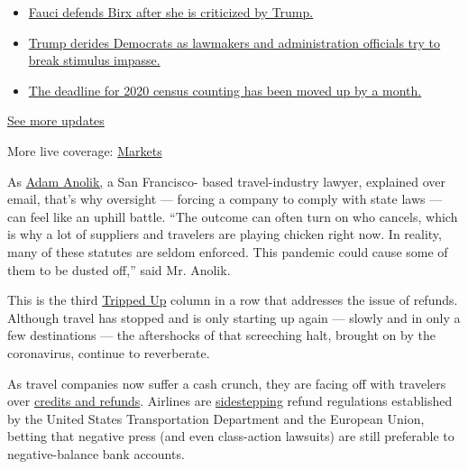 \begin{itemize}
\tightlist
\item
  \href{https://www.nytimes.com/2020/08/03/world/coronavirus-covid-19.html?action=click\&pgtype=Article\&state=default\&region=MAIN_CONTENT_1\&context=storylines_live_updates\#link-4547638f}{Fauci
  defends Birx after she is criticized by Trump.}
\item
  \href{https://www.nytimes.com/2020/08/03/world/coronavirus-covid-19.html?action=click\&pgtype=Article\&state=default\&region=MAIN_CONTENT_1\&context=storylines_live_updates\#link-15e7f995}{Trump
  derides Democrats as lawmakers and administration officials try to
  break stimulus impasse.}
\item
  \href{https://www.nytimes.com/2020/08/03/world/coronavirus-covid-19.html?action=click\&pgtype=Article\&state=default\&region=MAIN_CONTENT_1\&context=storylines_live_updates\#link-e5a2cda}{The
  deadline for 2020 census counting has been moved up by a month.}
\end{itemize}

\href{https://www.nytimes.com/2020/08/03/world/coronavirus-covid-19.html?action=click\&pgtype=Article\&state=default\&region=MAIN_CONTENT_1\&context=storylines_live_updates}{See
more updates}

More live coverage:
\href{https://www.nytimes.com/live/2020/08/03/business/stock-market-today-coronavirus?action=click\&pgtype=Article\&state=default\&region=MAIN_CONTENT_1\&context=storylines_live_updates}{Markets}

As \href{https://travellaw.com/}{Adam Anolik,} a San Francisco- based
travel-industry lawyer, explained over email, that's why oversight ---
forcing a company to comply with state laws --- can feel like an uphill
battle. ``The outcome can often turn on who cancels, which is why a lot
of suppliers and travelers are playing chicken right now. In reality,
many of these statutes are seldom enforced. This pandemic could cause
some of them to be dusted off,'' said Mr. Anolik.

This is the third
\href{https://www.nytimes.com/column/tripped-up}{Tripped Up} column in a
row that addresses the issue of refunds. Although travel has stopped and
is only starting up again --- slowly and in only a few destinations ---
the aftershocks of that screeching halt, brought on by the coronavirus,
continue to reverberate.

As travel companies now suffer a cash crunch, they are facing off with
travelers over
\href{https://www.nytimes.com/2020/05/12/travel/refunds-or-credits-travelers-and-businesses-face-off.html}{credits
and refunds}. Airlines are
\href{https://www.nytimes.com/2020/05/01/travel/trip-refund-airlines.html}{sidestepping}
refund regulations established by the United States Transportation
Department and the European Union, betting that negative press (and even
class-action lawsuits) are still preferable to negative-balance bank
accounts.

